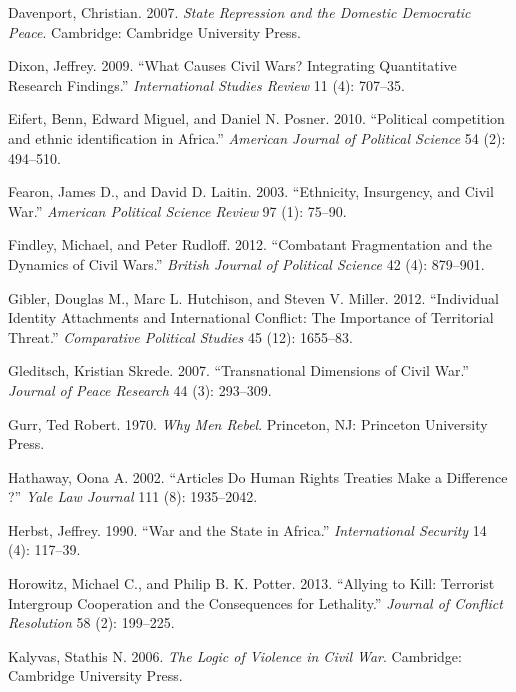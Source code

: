 \documentclass[12pt,]{book}
\theoremstyle{definition}
\theoremstyle{definition}
\theoremstyle{remark}
\begin{document}
\hypertarget{ref-Davenport2007a}{}
Davenport, Christian. 2007. \emph{State Repression and the Domestic
Democratic Peace}. Cambridge: Cambridge University Press.

\hypertarget{ref-Dixon2009a}{}
Dixon, Jeffrey. 2009. ``What Causes Civil Wars? Integrating Quantitative
Research Findings.'' \emph{International Studies Review} 11 (4):
707--35.

\hypertarget{ref-Eifert2010}{}
Eifert, Benn, Edward Miguel, and Daniel N. Posner. 2010. ``Political
competition and ethnic identification in Africa.'' \emph{American
Journal of Political Science} 54 (2): 494--510.

\hypertarget{ref-fearonlaitin03}{}
Fearon, James D., and David D. Laitin. 2003. ``Ethnicity, Insurgency,
and Civil War.'' \emph{American Political Science Review} 97 (1):
75--90.

\hypertarget{ref-Findley2012}{}
Findley, Michael, and Peter Rudloff. 2012. ``Combatant Fragmentation and
the Dynamics of Civil Wars.'' \emph{British Journal of Political
Science} 42 (4): 879--901.

\hypertarget{ref-Gibler2012}{}
Gibler, Douglas M., Marc L. Hutchison, and Steven V. Miller. 2012.
``Individual Identity Attachments and International Conflict: The
Importance of Territorial Threat.'' \emph{Comparative Political Studies}
45 (12): 1655--83.

\hypertarget{ref-Gleditsch2007}{}
Gleditsch, Kristian Skrede. 2007. ``Transnational Dimensions of Civil
War.'' \emph{Journal of Peace Research} 44 (3): 293--309.

\hypertarget{ref-gurr70}{}
Gurr, Ted Robert. 1970. \emph{Why Men Rebel}. Princeton, NJ: Princeton
University Press.

\hypertarget{ref-Hathaway2002}{}
Hathaway, Oona A. 2002. ``Articles Do Human Rights Treaties Make a
Difference ?'' \emph{Yale Law Journal} 111 (8): 1935--2042.

\hypertarget{ref-Herbst1990}{}
Herbst, Jeffrey. 1990. ``War and the State in Africa.''
\emph{International Security} 14 (4): 117--39.

\hypertarget{ref-Horowitz2013}{}
Horowitz, Michael C., and Philip B. K. Potter. 2013. ``Allying to Kill:
Terrorist Intergroup Cooperation and the Consequences for Lethality.''
\emph{Journal of Conflict Resolution} 58 (2): 199--225.

\hypertarget{ref-Kalyvas2006}{}
Kalyvas, Stathis N. 2006. \emph{The Logic of Violence in Civil War}.
Cambridge: Cambridge University Press.
\end{document}
